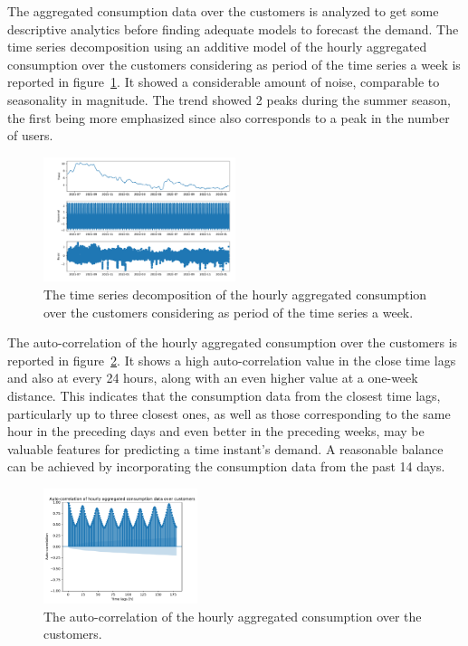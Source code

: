 The aggregated consumption data over the customers is analyzed to get some descriptive analytics before finding adequate models to forecast the demand.
The time series decomposition using an additive model of the hourly aggregated consumption over the customers considering as period of the time series a week is reported in figure~\ref{fig:demanddecomposition}.
It showed a considerable amount of noise, comparable to seasonality in magnitude.
The trend showed 2 peaks during the summer season, the first being more emphasized since also corresponds to a peak in the number of users.

\begin{figure}[H]
\centering
\includegraphics[width=0.5\textwidth]{images/demand/hourly_decomposition_week_period}
\caption{The time series decomposition of the hourly aggregated consumption over the customers considering as period of the time series a week.}
\label{fig:demanddecomposition}
\end{figure}

The auto-correlation of the hourly aggregated consumption over the customers is reported in figure~\ref{fig:demandcorrelation}.
It shows a high auto-correlation value in the close time lags and also at every 24 hours, along with an even higher value at a one-week distance.
This indicates that the consumption data from the closest time lags, particularly up to three closest ones, as well as those corresponding to the same hour in the preceding days and even better in the preceding weeks, may be valuable features for predicting a time instant's demand.
A reasonable balance can be achieved by incorporating the consumption data from the past 14 days.

\begin{figure}[H]
\centering
\includegraphics[width=0.4\textwidth]{images/demand/hourly_correlation_week_range}
\caption{The auto-correlation of the hourly aggregated consumption over the customers.}
\label{fig:demandcorrelation}
\end{figure}

